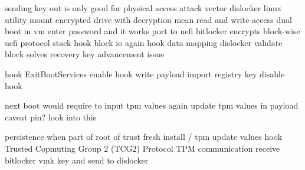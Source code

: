 sending key out is only good for physical access attack vector
dislocker linux utility
mount encrypted drive with decryption mean
read and write access
dual boot in vm
enter password and it works
port to uefi
bitlocker encrypts block-wise
uefi protocol stack
hook block io
again hook data mapping
dislocker validate block
solves recovery key advancement issue

hook ExitBootServices
enable hook
write payload
import registry key
disable hook

next boot would require to input tpm values again
update tpm values in payload
caveat pin? look into this

persistence when part of root of trust
fresh install / tpm update values
hook Trusted Copmuting Group 2 (TCG2) Protocol
TPM communication
receive bitlocker vmk key and send to dislocker